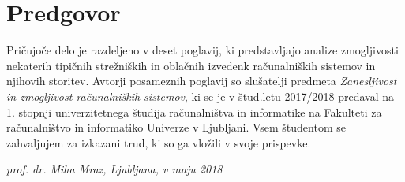 \chapter{Predgovor}

Pričujoče delo je razdeljeno v deset poglavij, ki predstavljajo analize zmogljivosti nekaterih tipičnih strežniških in oblačnih izvedenk računalniških sistemov in njihovih storitev. Avtorji posameznih poglavij so slušatelji predmeta \textit{Zanesljivost in zmogljivost računalniških sistemov}, ki se je v štud.letu 2017/2018 predaval na 1. stopnji univerzitetnega študija računalništva in informatike na Fakulteti za računalništvo in informatiko Univerze v Ljubljani. Vsem študentom se zahvaljujem za izkazani trud, ki so ga vložili v svoje prispevke.

\begin{flushright}
\textit{prof. dr. Miha Mraz, Ljubljana, v maju 2018}
\end{flushright}
